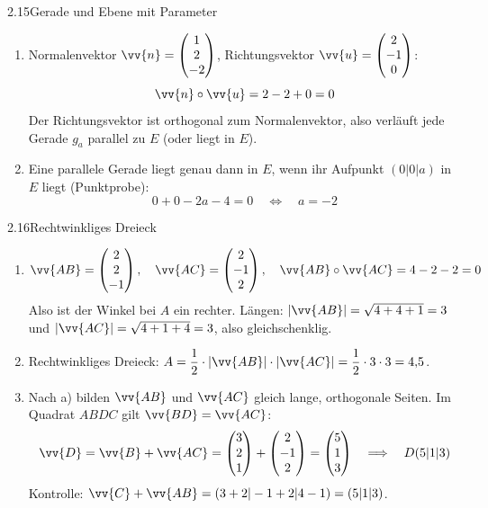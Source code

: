 \begin{loesung}{2.15}{Gerade und Ebene mit Parameter}
\begin{enumerate}[label=\alph*)]
  \item Normalenvektor $\vv{n} = \begin{pmatrix} 1\\ 2\\ -2\end{pmatrix}$, Richtungsvektor $\vv{u} = \begin{pmatrix} 2\\ -1\\ 0\end{pmatrix}$:
  \[\vv{n}\circ\vv{u} = 2-2+0 = 0\]
  Der Richtungsvektor ist orthogonal zum Normalenvektor, also verläuft jede Gerade $g_a$ parallel zu $E$ (oder liegt in $E$).
  \item Eine parallele Gerade liegt genau dann in $E$, wenn ihr Aufpunkt $(0|0|a)$ in $E$ liegt (Punktprobe):
  \[0+0-2a-4 = 0\quad\Longleftrightarrow\quad a = -2\]
\end{enumerate}
\end{loesung}

\begin{loesung}{2.16}{Rechtwinkliges Dreieck}
\begin{enumerate}[label=\alph*)]
  \item \[\vv{AB} = \begin{pmatrix} 2\\ 2\\ -1\end{pmatrix},\quad\vv{AC} = \begin{pmatrix} 2\\ -1\\ 2\end{pmatrix},\quad\vv{AB}\circ\vv{AC} = 4-2-2 = 0\]
  Also ist der Winkel bei $A$ ein rechter. Längen: $|\vv{AB}| = \sqrt{4+4+1} = 3$ und $|\vv{AC}| = \sqrt{4+1+4} = 3$, also gleichschenklig.
  \item Rechtwinkliges Dreieck: $A = \dfrac{1}{2}\cdot|\vv{AB}|\cdot|\vv{AC}| = \dfrac{1}{2}\cdot 3\cdot 3 = 4{,}5$.
  \item Nach a) bilden $\vv{AB}$ und $\vv{AC}$ gleich lange, orthogonale Seiten. Im Quadrat $ABDC$ gilt $\vv{BD} = \vv{AC}$:
  \[\vv{D} = \vv{B}+\vv{AC} = \begin{pmatrix} 3\\ 2\\ 1\end{pmatrix}+\begin{pmatrix} 2\\ -1\\ 2\end{pmatrix} = \begin{pmatrix} 5\\ 1\\ 3\end{pmatrix}\quad\Longrightarrow\quad D(5|1|3)\]
  Kontrolle: $\vv{C}+\vv{AB} = (3+2|-1+2|4-1) = (5|1|3)$. \checkmark
\end{enumerate}
\end{loesung}

